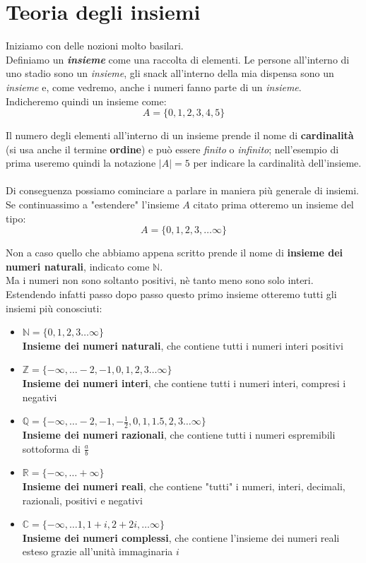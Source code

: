\section{Teoria degli insiemi}
Iniziamo con delle nozioni molto basilari. \\
Definiamo un \emph{\textbf{insieme}} come una raccolta di elementi. Le persone all'interno
di uno stadio sono un \emph{insieme}, gli snack all'interno della mia dispensa sono un
\emph{insieme} e, come vedremo, anche i numeri fanno parte di un \emph{insieme}. \\
Indicheremo quindi un insieme come: 
\[
  A = \{0, 1, 2, 3, 4, 5 \}
\]

Il numero degli elementi all'interno di un insieme prende il nome di \textbf{cardinalità}
(si usa anche il termine \textbf{ordine}) e può essere \emph{finito} o \emph{infinito}; nell'esempio di prima useremo quindi la
notazione \(|A| = 5\) per indicare la cardinalità dell'insieme.
\\
\\
Di conseguenza possiamo cominciare a parlare in maniera più generale di insiemi.
Se continuassimo a "estendere" l'insieme \(A\) citato prima otteremo un insieme
del tipo: 
\[
  A = \{0, 1, 2, 3, \dots \infty \}
\]

Non a caso quello che abbiamo appena scritto prende il nome di 
\textbf{insieme dei numeri naturali}, indicato come \( \mathbb{N} \). \\
Ma i numeri non sono soltanto positivi, nè tanto meno sono solo interi.
Estendendo infatti passo dopo passo questo primo insieme otteremo tutti gli 
insiemi più conosciuti:

\begin{itemize}
  \item \( \mathbb{N} = \{0, 1, 2, 3 \dots \infty \} \) \\ 
  \textbf{Insieme dei numeri naturali},
  che contiene tutti i numeri interi positivi
  \item \( \mathbb{Z} = \{ -\infty, \dots -2, -1, 0, 1, 2, 3 \dots \infty \} \) \\ 
  \textbf{Insieme dei numeri interi},
  che contiene tutti i numeri interi, compresi i negativi
  \item \( \mathbb{Q} = \{ -\infty, \dots -2, -1, -\frac{1}{2}, 0, 1, 1.5, 2, 3 \dots \infty \} \) \\ 
  \textbf{Insieme dei numeri razionali},
  che contiene tutti i numeri espremibili sottoforma di \( \frac{a}{b} \)
  \item \(\mathbb{R} = \{ -\infty, \dots + \infty\}\) \\
  \textbf{Insieme dei numeri reali},
  che contiene "tutti" i numeri, interi, decimali, razionali, positivi e negativi
  \item \( \mathbb{C} = \{ -\infty, \dots 1, 1 +i, 2 +2i, \dots \infty \} \) \\
  \textbf{Insieme dei numeri complessi},
  che contiene l'insieme dei numeri reali esteso grazie all'unità immaginaria \(i\)
\end{itemize}

